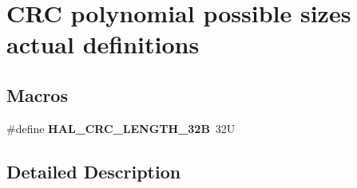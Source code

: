 \hypertarget{group___c_r_c_ex___polynomial___size___definitions}{}\section{C\+RC polynomial possible sizes actual definitions}
\label{group___c_r_c_ex___polynomial___size___definitions}
\subsection*{Macros}
\begin{DoxyCompactItemize}
\item 
\mbox{\label{group___c_r_c_ex___polynomial___size___definitions_ga429a30f7474eb8bc2f0bd3af6af77f3b}} 
\#define {\bfseries H\+A\+L\+\_\+\+C\+R\+C\+\_\+\+L\+E\+N\+G\+T\+H\+\_\+32B}~32U
\end{DoxyCompactItemize}


\subsection{Detailed Description}
